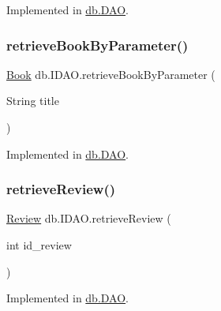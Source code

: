 Implemented in \hyperlink{classdb_1_1_d_a_o_ade778f907d0a74dc27c4fc03f8709815}{db.\+D\+AO}.

\mbox{\label{interfacedb_1_1_i_d_a_o_a4c5eda35bfbba1b0a994efe00f99a544}} 
\subsubsection{\texorpdfstring{retrieve\+Book\+By\+Parameter()}{retrieveBookByParameter()}}
{\footnotesize\ttfamily \hyperlink{classserver_1_1data_1_1_book}{Book} db.\+I\+D\+A\+O.\+retrieve\+Book\+By\+Parameter (\begin{DoxyParamCaption}\item[{String}]{title }\end{DoxyParamCaption})}



Implemented in \hyperlink{classdb_1_1_d_a_o_a1f8580da682f8a8af4896c491c3b6611}{db.\+D\+AO}.

\mbox{\label{interfacedb_1_1_i_d_a_o_a53fd20610d94f7c5f0f713dad7528c26}} 
\subsubsection{\texorpdfstring{retrieve\+Review()}{retrieveReview()}}
{\footnotesize\ttfamily \hyperlink{classserver_1_1data_1_1_review}{Review} db.\+I\+D\+A\+O.\+retrieve\+Review (\begin{DoxyParamCaption}\item[{int}]{id\+\_\+review }\end{DoxyParamCaption})}



Implemented in \hyperlink{classdb_1_1_d_a_o_ae43e182fae8ee7028db6ff17c2d5768f}{db.\+D\+AO}.

\mbox{\label{interfacedb_1_1_i_d_a_o_ad00bb5255d0badadbf5244799c3b708f}} 
